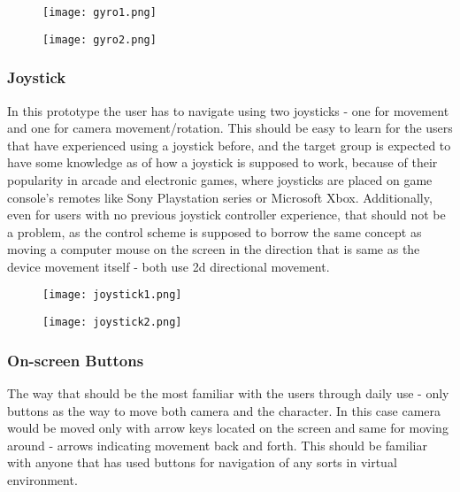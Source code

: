 \begin{figure}[H]
\centering
\begin{minipage}{.5\textwidth}
  \centering
  \texttt{[image: gyro1.png]}
  \label{fig:test1}
\end{minipage}%
\begin{minipage}{.5\textwidth}
  \centering
  \texttt{[image: gyro2.png]}
  \label{fig:test2}
\end{minipage}
\end{figure}


\subsubsection{Joystick}
In this prototype the user has to navigate using two joysticks - one for movement and one for camera movement/rotation. This should be easy to learn for the users that have experienced using a joystick before, and the target group is expected to have some knowledge as of how a joystick is supposed to work, because of their popularity in arcade and electronic games, where joysticks are placed on game console’s remotes like Sony Playstation series or Microsoft Xbox. Additionally, even for users with no previous joystick controller experience, that should not be a problem, as the control scheme is supposed to borrow the same concept as moving a computer mouse on the screen in the direction that is same as the device movement itself - both use 2d directional movement.

\begin{figure}[H]
\centering
\begin{minipage}{.5\textwidth}
  \centering
  \texttt{[image: joystick1.png]}
\end{minipage}%
\begin{minipage}{.5\textwidth}
  \centering
  \texttt{[image: joystick2.png]}
\end{minipage}
\end{figure}

\subsubsection{On-screen Buttons}
The way that should be the most familiar with the users through daily use - only buttons as the way to move both camera and the character. In this case camera would be moved only with arrow keys located on the screen and same for moving around - arrows indicating movement back and forth. This should be familiar with anyone that has used buttons for navigation of any sorts in virtual environment.

